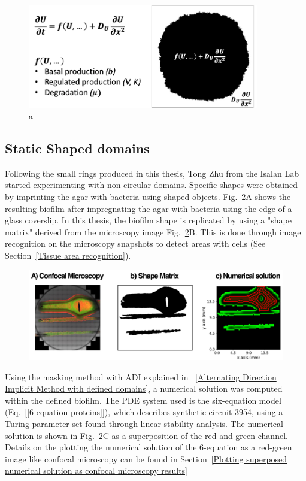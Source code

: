 \begin{figure}[H]
    \centering

    \includegraphics[width=0.9\textwidth]{chapters/Chapter 3/mask}
    \caption{a}
    \label{mask}
\end{figure}

\subsection{Static Shaped domains}
Following the small rings produced in this thesis, Tong Zhu from the Isalan Lab started experimenting with non-circular domains.
Specific shapes were obtained by imprinting the agar with bacteria using shaped objects.
Fig.~\ref{shmoo}A shows the resulting biofilm after impregnating the agar with bacteria using the edge of a glass coverslip. %
In this thesis, the biofilm shape is replicated by using a "shape matrix" derived from the microscopy image Fig.~\ref{shmoo}B.
This is done through image recognition on the microscopy snapshots to detect areas with cells (See Section~\ref{Tissue area recognition}).


\begin{figure}[H]
    \centering

    \includegraphics[width=1\textwidth]{chapters/Chapter 3/shmoo}
    \caption{}
    \label{shmoo}
\end{figure}
Using the masking method with ADI explained in ~\ref{Alternating Direction Implicit Method with defined domains}, a numerical solution was computed within the defined biofilm.
The PDE system used is the six-equation model (Eq.~\ref{[6 equation proteins]}), which describes synthetic circuit 3954, using a Turing parameter set found through linear stability analysis.
The numerical solution is shown in Fig.~\ref{shmoo}C as a superposition of the red and green channel.
Details on the plotting the numerical solution of the 6-equation as a red-green image like confocal microscopy can be found in Section~\ref{Plotting superposed numerical solution as confocal microscopy results}

